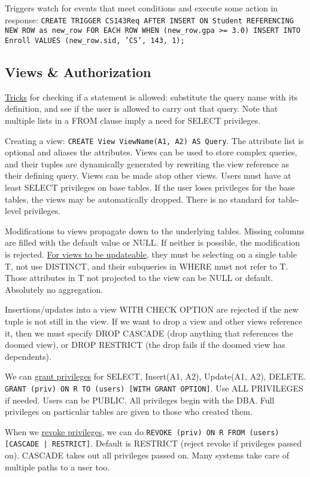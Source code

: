 \documentclass[10pt,letterpaper,twocolumn]{article}
\begin{document}
Triggers watch for events that meet conditions
and execute some action in response: \texttt{CREATE TRIGGER
CS143Req AFTER INSERT ON Student REFERENCING NEW ROW
as new\_row FOR EACH ROW WHEN (new\_row.gpa >= 3.0)
INSERT INTO Enroll VALUES (new\_row.sid, 'CS', 143, 1);}


\subsection{Views \& Authorization} 

\underline{Tricks} for checking if a statement is allowed: 
substitute the query name with its definition, and see if 
the user is allowed to carry out that query. Note that
multiple lists in a FROM clause imply a need for SELECT privileges.

Creating a view: \texttt{CREATE View ViewName(A1, A2) AS Query}.
The attribute list is optional and aliases the attributes. Views can be used to store complex queries, and 
their tuples are dynamically generated by rewriting
the view reference as their defining query. Views
can be made atop other views. Users must have 
at least SELECT privileges on base tables. If
the user loses privileges for the base tables, 
the views may be automatically dropped.
There is no standard for table-level privileges.

Modifications to views propagate down to the 
underlying tables. Missing columns are filled
with the default value or NULL. If neither is 
possible, the modification is rejected.
\underline{For views to be updateable}, they must be 
selecting on a single table T, not use DISTINCT, 
and their subqueries in WHERE must not refer to T.
Those attributes in T not projected to the view
can be NULL or default. Absolutely no aggregation.

Insertions/updates into a view WITH CHECK OPTION
are rejected if the new tuple is not still in the 
view. If we want to drop a view and other views
reference it, then we must specify DROP CASCADE
(drop anything that references the doomed view), 
or DROP RESTRICT (the drop fails if the doomed
view has dependents). 

We can \underline{grant privileges} for
SELECT, Insert(A1, A2), Update(A1, A2), DELETE.
\texttt{GRANT (priv) ON R TO (users) [WITH GRANT OPTION]}. Use ALL PRIVILEGES if needed. Users can be 
PUBLIC. All privileges begin with the DBA. Full
privileges on particular tables are given to those
who created them. 

When we \underline{revoke privileges}, we
can do \texttt{REVOKE (priv) ON R FROM (users) [CASCADE | RESTRICT]}.
Default is RESTRICT (reject revoke if privileges passed on). CASCADE takes out all privileges passed on. Many systems take care of multiple paths to a user too.
\end{document}
